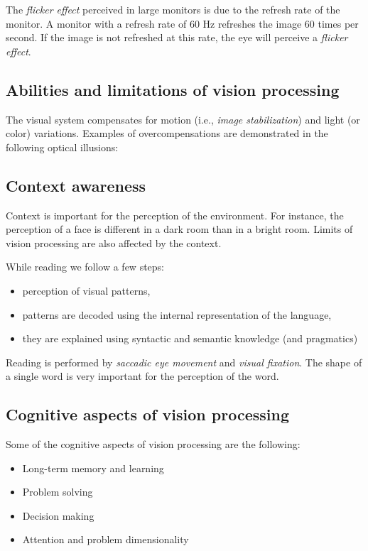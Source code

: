 \documentclass[11pt,a4paper]{article}
\theoremstyle{definition}
\theoremstyle{plain}
\theoremstyle{remark}
\begin{document}
The \textit{flicker effect} perceived in large monitors is due to the refresh rate of the monitor.
A monitor with a refresh rate of 60 Hz refreshes the image 60 times per second.
If the image is not refreshed at this rate, the eye will perceive a \textit{flicker effect}.

\subsection{Abilities and limitations of vision processing}
The visual system compensates for motion (i.e., \textit{image stabilization}) and light (or color) variations.
Examples of overcompensations are demonstrated in the following optical illusions:

\subsection{Context awareness}
Context is important for the perception of the environment.
For instance, the perception of a face is different in a dark room than in a bright room. 
Limits of vision processing are also affected by the context.

While reading we follow a few steps:
\begin{itemize}
    \item perception of visual patterns,
    \item patterns are decoded using the internal representation of the 
    language,
    \item they are explained using syntactic and semantic 
    knowledge (and pragmatics)
\end{itemize}
Reading is performed by \textit{saccadic eye movement} and \textit{visual fixation}.
The shape of a single word is very important for the perception of the word.

\subsection{Cognitive aspects of vision processing}
Some of the cognitive aspects of vision processing are the following:
 \begin{itemize}
    \item Long-term memory and learning
    \item Problem solving
    \item Decision making
    \item Attention and problem dimensionality
\end{itemize}
\end{document}
